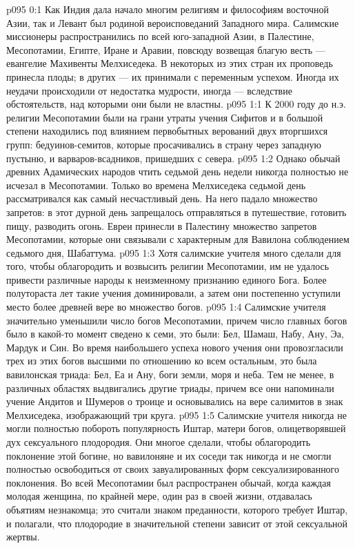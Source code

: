 \author{Мелхиседек}
\vs p095 0:1 Как Индия дала начало многим религиям и философиям восточной Азии, так и Левант был родиной вероисповеданий Западного мира. Салимские миссионеры распространились по всей юго\hyp{}западной Азии, в Палестине, Месопотамии, Египте, Иране и Аравии, повсюду возвещая благую весть --- евангелие Махивенты Мелхиседека. В некоторых из этих стран их проповедь принесла плоды; в других --- их принимали с переменным успехом. Иногда их неудачи происходили от недостатка мудрости, иногда --- вследствие обстоятельств, над которыми они были не властны.
\vs p095 1:1 К 2000 году до н.э. религии Месопотамии были на грани утраты учения Сифитов и в большой степени находились под влиянием первобытных верований двух вторгшихся групп: бедуинов\hyp{}семитов, которые просачивались в страну через западную пустыню, и варваров\hyp{}всадников, пришедших с севера.
\vs p095 1:2 Однако обычай древних Адамических народов чтить седьмой день недели никогда полностью не исчезал в Месопотамии. Только во времена Мелхиседека седьмой день рассматривался как самый несчастливый день. На него падало множество запретов: в этот дурной день запрещалось отправляться в путешествие, готовить пищу, разводить огонь. Евреи принесли в Палестину множество запретов Месопотамии, которые они связывали с характерным для Вавилона соблюдением седьмого дня, Шабаттума.
\vs p095 1:3 Хотя салимские учителя много сделали для того, чтобы облагородить и возвысить религии Месопотамии, им не удалось привести различные народы к неизменному признанию единого Бога. Более полутораста лет такие учения доминировали, а затем они постепенно уступили место более древней вере во множество богов.
\vs p095 1:4 Салимские учителя значительно уменьшили число богов Месопотамии, причем число главных богов было в какой\hyp{}то момент сведено к семи, это были: Бел, Шамаш, Набу, Ану, Эа, Мардук и Син. Во время наибольшего успеха нового учения они провозгласили трех из этих богов высшими по отношению ко всем остальным, это была вавилонская триада: Бел, Еа и Ану, боги земли, моря и неба. Тем не менее, в различных областях выдвигались другие триады, причем все они напоминали учение Андитов и Шумеров о троице и основывались на вере салимитов в знак Мелхиседека, изображающий три круга.
\vs p095 1:5 Салимские учителя никогда не могли полностью побороть популярность Иштар, матери богов, олицетворявшей дух сексуального плодородия. Они многое сделали, чтобы облагородить поклонение этой богине, но вавилоняне и их соседи так никогда и не смогли полностью освободиться от своих завуалированных форм сексуализированного поклонения. Во всей Месопотамии был распространен обычай, когда каждая молодая женщина, по крайней мере, один раз в своей жизни, отдавалась объятиям незнакомца; это считали знаком преданности, которого требует Иштар, и полагали, что плодородие в значительной степени зависит от этой сексуальной жертвы.
